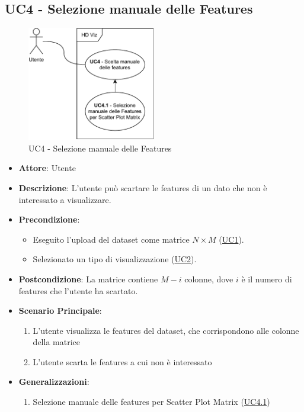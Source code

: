 \subsection{UC4 - Selezione manuale delle Features}
\label{uc4}

    \begin{figure}[htbp]
        \centering
        \includegraphics[width=0.5\textwidth]{source/sections/casi-uso/diagrams/uc4.pdf}
        \caption{UC4 - Selezione manuale delle Features}
        \label{fig:uc4}
    \end{figure}
    
    \begin{itemize}
    \item \textbf{Attore}: Utente
    \item \textbf{Descrizione}: L'utente può scartare le features di un dato che non è interessato a visualizzare.
    \item \textbf{Precondizione}: 
     \begin{itemize}
        \item Eseguito l'upload del dataset come matrice $N\times M$ (\hyperref[uc1]{UC1}).
        \item Selezionato un tipo di visualizzazione (\hyperref[uc2]{UC2}).
    \end{itemize}
    \item \textbf{Postcondizione}: La matrice contiene $M-i$ colonne, dove $i$ è il numero di features che l'utente ha scartato.
    \item \textbf{Scenario Principale}: 
    \begin{enumerate}
        \item L'utente visualizza le features del dataset, che corrispondono alle colonne della matrice
        \item L'utente scarta le features a cui non è interessato
    \end{enumerate}
    \item \textbf{Generalizzazioni}:
        \begin{enumerate}
            \item Selezione manuale delle features per Scatter Plot Matrix (\hyperref[uc4.1]{UC4.1})
        \end{enumerate}
    \end{itemize}
    
